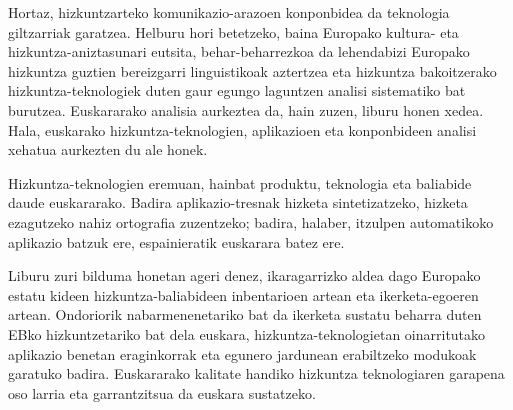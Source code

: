 \begin{multicols}{2}
Hortaz, hizkuntzarteko komunikazio-arazoen konponbidea da teknologia giltzarriak garatzea. Helburu hori betetzeko, baina Europako kultura- eta hizkuntza-aniztasunari eutsita, behar-beharrezkoa da lehendabizi Europako hizkuntza guztien bereizgarri linguistikoak aztertzea eta hizkuntza bakoitzerako hizkuntza-teknologiek duten gaur egungo laguntzen analisi sistematiko bat burutzea. Euskararako analisia aurkeztea da, hain zuzen, liburu honen xedea. Hala, euskarako hizkuntza-teknologien, aplikazioen eta konponbideen analisi xehatua aurkezten du ale honek.


Hizkuntza-teknologien eremuan, hainbat produktu, teknologia eta baliabide daude euskararako. Badira aplikazio-tresnak hizketa sintetizatzeko, hizketa ezagutzeko nahiz ortografia zuzentzeko; badira, halaber, itzulpen automatikoko aplikazio batzuk ere, espainieratik euskarara batez ere. 

Liburu zuri bilduma honetan ageri denez, ikaragarrizko aldea dago Europako estatu kideen hizkuntza-baliabideen inbentarioen artean eta ikerketa-egoeren artean. Ondoriorik nabarmenenetariko bat da ikerketa sustatu beharra duten EBko hizkuntzetariko bat dela euskara, hizkuntza-teknologietan oinarritutako aplikazio benetan eraginkorrak eta egunero jardunean erabiltzeko modukoak garatuko badira. Euskararako kalitate handiko hizkuntza teknologiaren garapena oso larria eta garrantzitsua da euskara sustatzeko.

\end{multicols}

\clearpage



